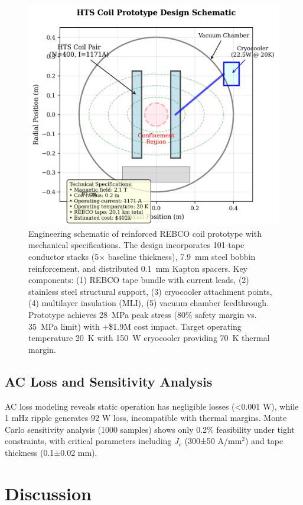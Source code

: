 \documentclass[10pt,twocolumn]{article}
\begin{document}
\begin{figure}[ht]
	\centering
	\includegraphics[width=0.9\columnwidth]{figures/prototype.png}
	\caption{Engineering schematic of reinforced REBCO coil prototype with mechanical specifications. The design incorporates 101-tape conductor stacks (5$\times$ baseline thickness), 7.9~mm steel bobbin reinforcement, and distributed 0.1~mm Kapton spacers. Key components: (1) REBCO tape bundle with current leads, (2) stainless steel structural support, (3) cryocooler attachment points, (4) multilayer insulation (MLI), (5) vacuum chamber feedthrough. Prototype achieves 28~MPa peak stress (80\% safety margin vs. 35~MPa limit) with +\$1.9M cost impact. Target operating temperature 20~K with 150~W cryocooler providing 70~K thermal margin.}
	\label{fig:prototype}
\end{figure}

\subsection{AC Loss and Sensitivity Analysis}

AC loss modeling reveals static operation has negligible losses (<0.001 W), while 1 mHz ripple generates 92 W loss, incompatible with thermal margins. Monte Carlo sensitivity analysis (1000 samples) shows only 0.2\% feasibility under tight constraints, with critical parameters including $J_c$ (300±50 A/mm$^2$) and tape thickness (0.1±0.02 mm).

\section{Discussion}
\end{document}
